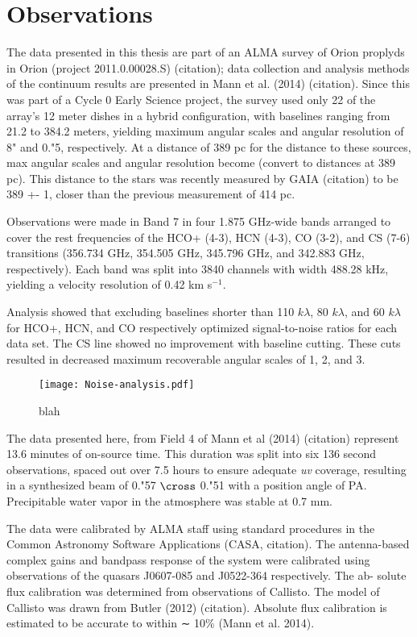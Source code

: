\chapter{Observations}
\label{chap:observations}

The data presented in this thesis are part of an ALMA survey of Orion proplyds in Orion (project 2011.0.00028.S) (citation); data collection and analysis methods of the continuum results are presented in Mann et al. (2014) (citation). Since this was part of a Cycle 0 Early Science project, the survey used only 22 of the array's 12 meter dishes in a hybrid configuration, with baselines ranging from 21.2 to 384.2 meters, yielding maximum angular scales and angular resolution of 8" and 0."5, respectively. At a distance of 389 pc for the distance to these sources, max angular scales and angular resolution become (convert to distances at 389 pc). This distance to the stars was recently measured by GAIA (citation) to be 389 +- 1, closer than the previous measurement of 414 pc.


Observations were made in Band 7 in four 1.875 GHz-wide bands arranged to cover the rest frequencies of the HCO+ (4-3), HCN (4-3), CO (3-2), and CS (7-6) transitions (356.734 GHz, 354.505 GHz, 345.796 GHz, and 342.883 GHz, respectively). Each band was split into 3840 channels with width 488.28 kHz, yielding a velocity resolution of 0.42 km s$^{-1}$.



Analysis showed that excluding baselines shorter than 110 $k \lambda$, 80 $k \lambda$, and 60 $k \lambda$ for HCO+, HCN, and CO respectively optimized signal-to-noise ratios for each data set. The CS line showed no improvement with baseline cutting. These cuts resulted in decreased maximum recoverable angular scales of 1, 2, and 3.

\begin{figure}
  \centering
  \texttt{[image: Noise-analysis.pdf]}
  \caption{blah}
\end{figure}

The data presented here, from Field 4 of Mann et al (2014) (citation) represent 13.6 minutes of on-source time. This duration was split into six 136 second observations, spaced out over 7.5 hours to ensure adequate \textit{uv} coverage, resulting in a synthesized beam of 0."57 $\cross$ 0."51 with a position angle of PA. Precipitable water vapor in the atmosphere was stable at 0.7 mm.




The data were calibrated by ALMA staff using standard procedures in the Common Astronomy Software Applications (CASA, citation). The antenna-based complex gains and bandpass response of the system were calibrated using observations of the quasars J0607-085 and J0522-364 respectively. The ab- solute flux calibration was determined from observations of Callisto. The model of Callisto was drawn from Butler (2012) (citation). Absolute flux calibration is estimated to be accurate to within ∼ 10\% (Mann et al. 2014).

